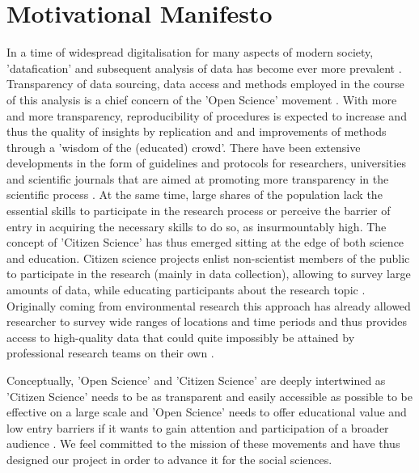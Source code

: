\documentclass[preprint,12pt,authoryear]{elsarticle}
\begin{document}
	\section{Motivational Manifesto}
	In a time of widespread digitalisation for many aspects of modern society, 'datafication' and subsequent analysis of data has become ever more prevalent \citep{baack_datafication_2015, lycett_datafication:_2013}. Transparency of data sourcing, data access and methods employed in the course of this analysis is a chief concern of the 'Open Science' movement \citep{delfanti_open_2010}. With more and more transparency, reproducibility of procedures is expected to increase and thus the quality of insights by replication and and improvements of methods through a 'wisdom of the (educated) crowd'. There have been extensive developments in the form of guidelines and protocols for researchers, universities and scientific journals that are aimed at promoting more transparency in the scientific process \citep{nosek_promoting_2015, miguel_promoting_2014}. 
	At the same time, large shares of the population lack the essential skills to participate in the research process or perceive the barrier of entry in acquiring the necessary skills to do so, as insurmountably high. The concept of 'Citizen Science' has thus emerged sitting at the edge of both science and education. Citizen science projects enlist non-scientist members of the public to participate in the research (mainly in data collection), allowing to survey large amounts of data, while educating participants about the research topic \citep{shirk_public_2012}. Originally coming from environmental research this approach has already allowed researcher to survey wide ranges of locations and time periods and thus provides access to high-quality data that could quite impossibly be attained by professional research teams on their own \citep{bonney_citizen_2009}.
	
	Conceptually, 'Open Science' and 'Citizen Science' are deeply intertwined as 'Citizen Science' needs to be as transparent and easily accessible as possible to be effective on a large scale \citep{nov_dusting_2011} and 'Open Science' needs to offer educational value and low entry barriers if it wants to gain attention and participation of a broader audience \citep{newman_future_2012}. We feel committed to the mission of these movements and have thus designed our project in order to advance it for the social sciences. 
	
\end{document}
